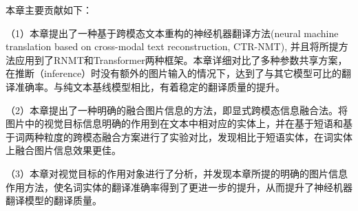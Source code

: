 本章主要贡献如下：

（1）本章提出了一种基于跨模态文本重构的神经机器翻译方法(neural machine translation based on cross-modal text reconstruction, CTR-NMT), 并且将所提方法应用到了RNMT和Transformer两种框架。本章详细对比了多种参数共享方案，在推断（inference）时没有额外的图片输入的情况下，达到了与其它模型可比的翻译准确率。与纯文本基线模型相比，有着稳定的翻译质量的提升。

（2）本章提出了一种明确的融合图片信息的方法，即显式跨模态信息融合法。将图片中的视觉目标信息明确的作用到在文本中相对应的实体上，并在基于短语和基于词两种粒度的跨模态融合方案进行了实验对比，发现相比于短语实体，在词实体上融合图片信息效果更佳。

（3）本章对视觉目标的作用对象进行了分析，并发现本章所提的明确的图片信息作用方法，使名词实体的翻译准确率得到了更进一步的提升，从而提升了神经机器翻译模型的翻译质量。
